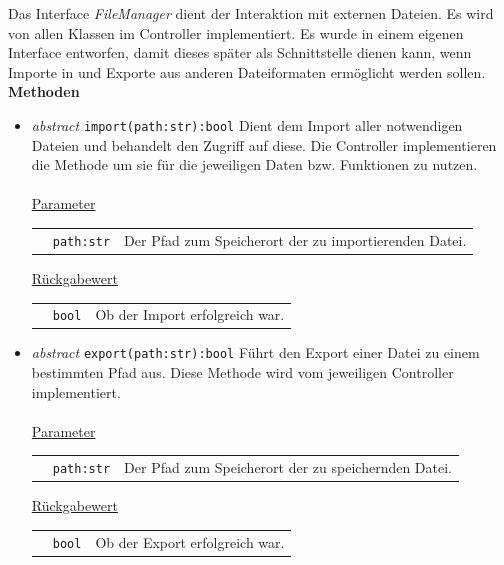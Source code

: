 \documentclass{article}
\begin{document}
Das Interface \textit{FileManager} dient der Interaktion mit externen Dateien. Es wird von allen Klassen im Controller implementiert. Es wurde in einem eigenen Interface entworfen, damit dieses später als Schnittstelle dienen kann, wenn Importe in und Exporte aus anderen Dateiformaten ermöglicht werden sollen.
\newline \newline
\textbf{{Methoden}}
\begin{itemize}
\item \textit{\flqq{}abstract\frqq} \texttt{import(path:str):bool} \newline Dient dem Import aller notwendigen Dateien und behandelt den Zugriff auf diese. Die Controller implementieren die Methode um sie für die jeweiligen Daten bzw. Funktionen zu nutzen.
\\\\
\underline{{Parameter}}

\begin{tabular}{lll}
 & \texttt{path:str} & Der Pfad zum Speicherort der zu importierenden Datei. \\
\end{tabular}

\underline{{Rückgabewert}}

\begin{tabular}{lll}
 & \texttt{bool} & Ob der Import erfolgreich war. \\
\end{tabular}

\item \textit{\flqq{}abstract\frqq} \texttt{export(path:str):bool} \newline Führt den Export einer Datei zu einem bestimmten Pfad aus. Diese Methode wird vom jeweiligen Controller implementiert.
\\\\
\underline{{Parameter}}

\begin{tabular}{lll}
 & \texttt{path:str} & Der Pfad zum Speicherort der zu speichernden Datei. \\
\end{tabular}

\underline{{Rückgabewert}}

\begin{tabular}{lll}
 & \texttt{bool} & Ob der Export erfolgreich war. \\
\end{tabular}
\end{itemize}
\end{document}
